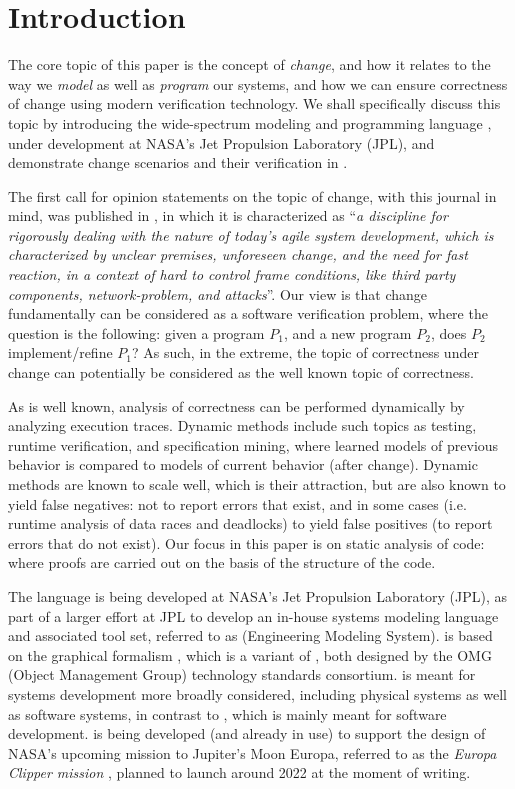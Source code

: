
\section{Introduction}

The core topic of this paper is the concept of {\em change}, and how it
relates to the way we {\em model} as well as {\em program} our systems, and how 
we can ensure correctness of change using modern verification technology.
We shall specifically discuss this topic by introducing the wide-spectrum
modeling and programming language \Klang, under development at NASA's Jet Propulsion 
Laboratory (JPL), and demonstrate change scenarios and their 
verification in \Klang.

The first call for opinion statements on the topic of change, with this 
journal in mind, was published in \cite{steffen-isola-2014}, in which it is 
characterized as ``{\em a discipline for rigorously dealing with the nature of 
today's agile system development, which is characterized by unclear premises, 
unforeseen change, and the need for fast reaction, in a context of hard to 
control frame conditions, like third party components, network-problem, and 
attacks}''. 
%
Our view is that change fundamentally can be considered as a software 
verification problem, where the question is the following: given a program 
$P_1$, and a new program $P_2$, does $P_2$ implement/refine $P_1$?
As such, in the extreme, the topic of correctness under change can  potentially be 
considered as the well known topic of correctness. 

As is well known, analysis of correctness can be performed dynamically by analyzing 
execution traces. Dynamic methods include such topics 
as testing, runtime verification, and specification mining, where learned models of 
previous behavior is compared to models of current behavior (after change). Dynamic 
methods are known to scale well, which is their attraction, but are also known to 
yield false negatives: not to report errors that exist, and in some cases (i.e. runtime analysis of data races and deadlocks) to yield 
false positives (to report errors that do not exist). Our focus
in this paper is on static analysis of code: where proofs are carried out on the basis 
of the structure of the code.

The \Klang{} language is being developed at NASA's Jet Propulsion Laboratory (JPL),
as part of a larger effort at JPL to develop an in-house systems modeling language and 
associated tool set, referred to as \ems{} (Engineering Modeling System). \ems{} is 
based on the graphical \sysml{} formalism \cite{sysml}, which is a variant of \uml{} 
\cite{uml}, both designed by the OMG (Object Management Group) technology standards 
consortium. \sysml{} is meant for systems development more broadly considered, 
including physical systems as well as software systems, in contrast to \uml{}, which 
is mainly meant for software development. 
\ems{} is being developed (and already in use) to support the design of NASA's 
upcoming mission to Jupiter's Moon Europa, referred to as the {\em Europa Clipper 
mission} \cite{europa-clipper}, planned to launch around 2022 at the 
moment of writing.

